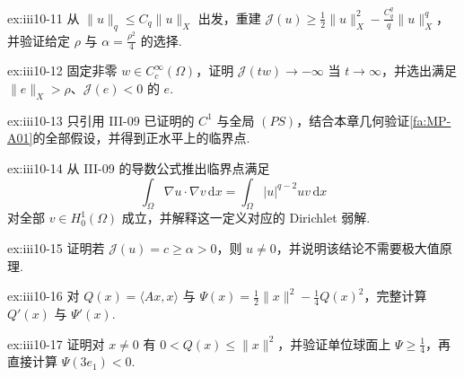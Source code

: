 \begin{FAExercise}{ex:iii10-11}
从 \(\displaystyle\|u\|_q\leqslant C_q\|u\|_X\) 出发，重建 \(\displaystyle\mathcal J(u)\geqslant\frac{1}{2}\|u\|_X^2-\frac{C_q^q}{q}\|u\|_X^q\)，并验证给定 \(\displaystyle\rho\) 与 \(\displaystyle\alpha=\frac{\rho^2}{4}\) 的选择.
\end{FAExercise}

\begin{FAExercise}{ex:iii10-12}
固定非零 \(\displaystyle w\in C_c^\infty(\Omega)\)，证明 \(\displaystyle\mathcal J(tw)\to-\infty\) 当 \(\displaystyle t\to\infty\)，并选出满足 \(\displaystyle\|e\|_X>\rho\)、\(\displaystyle\mathcal J(e)<0\) 的 \(\displaystyle e\).
\end{FAExercise}

\begin{FAExercise}{ex:iii10-13}
只引用 III-09 已证明的 \(\displaystyle C^1\) 与全局 \(\displaystyle(PS)\)，结合本章几何验证\autoref{fa:MP-A01}的全部假设，并得到正水平上的临界点.
\end{FAExercise}

\begin{FAExercise}{ex:iii10-14}
从 III-09 的导数公式推出临界点满足
\[
\int_\Omega\nabla u\mathbin{\cdot}\nabla v\,\mathrm{d}x
=
\int_\Omega|u|^{q-2}uv\,\mathrm{d}x
\]
对全部 \(\displaystyle v\in H_0^1(\Omega)\) 成立，并解释这一定义对应的 Dirichlet 弱解.
\end{FAExercise}

\begin{FAExercise}[正水平推出非平凡性]{ex:iii10-15}
证明若 \(\displaystyle\mathcal J(u)=c\geqslant\alpha>0\)，则 \(\displaystyle u\neq0\)，并说明该结论不需要极大值原理.
\end{FAExercise}

\begin{FAExercise}{ex:iii10-16}
对 \(\displaystyle Q(x)=\langle Ax,x\rangle\) 与 \(\displaystyle\Psi(x)=\frac{1}{2}\|x\|^2-\frac{1}{4}Q(x)^2\)，完整计算 \(\displaystyle Q'(x)\) 与 \(\displaystyle\Psi'(x)\).
\end{FAExercise}

\begin{FAExercise}[反例中的几何]{ex:iii10-17}
证明对 \(\displaystyle x\neq0\) 有 \(\displaystyle0<Q(x)\leqslant\|x\|^2\)，并验证单位球面上 \(\displaystyle\Psi\geqslant\frac{1}{4}\)，再直接计算 \(\displaystyle\Psi(3e_1)<0\).
\end{FAExercise}

